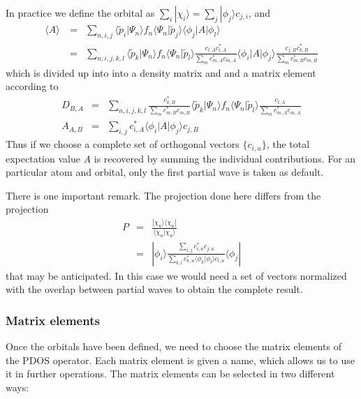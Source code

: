 \documentclass[final,12pt]{article}
\begin{document}
{{{{{{In practice we define the orbital as
$\sum_i|\chi_i\rangle=\sum_j|\phi_j\rangle c_{j,i}$, and
\begin{eqnarray*}
\langle A\rangle\
&=&\sum_{n,i,j}
\langle\tilde{p}_i|\Psi_n\rangle 
f_n\langle\Psi_n|\tilde{p}_j\rangle\langle\phi_j|A|\phi_l\rangle
\\
&=&\sum_{n,i,j,k,l}
\langle\tilde{p}_k|\Psi_n\rangle 
f_n\langle\Psi_n|\tilde{p}_l\rangle
\frac{c_{l,A}c^*_{i,A}}{\sum_m c^*_{m,A}c_{m,A}}
\langle\phi_i|A|\phi_j\rangle
\frac{c_{j,B}c^*_{k,B}}{\sum_m c^*_{m,B}c_{m,B}}
\end{eqnarray*}
which is divided up into into a density matrix and and a matrix
element according to
\begin{eqnarray*}
D_{B,A}&=&\sum_{n,i,j,k,l}
\frac{c^*_{k,B}}{\sum_m c^*_{m,B}c_{m,B}}
\langle\tilde{p}_k|\Psi_n\rangle 
f_n\langle\Psi_n|\tilde{p}_l\rangle
\frac{c_{l,A}}{\sum_m c^*_{m,A}c_{m,A}}
\\
A_{A,B}&=&\sum_{i,j}c^*_{i,A}\langle\phi_i|A|\phi_j\rangle c_{j,B}
\end{eqnarray*}
Thus if we choose a complete set of orthogonal vectors $\{c_{i,u}\}$,
the total expectation value $A$ is recovered by summing the individual
contributions. For an particular atom and orbital, only the first
partial wave is taken as default.

There is one important remark. The projection done here differs from
the projection 
\begin{eqnarray*}
P&=&\frac{|\chi_u\rangle\langle\chi_u|}{\langle\chi_u|\chi_u\rangle}
\\
&=&|\phi_i\rangle 
\frac{\sum_{i,j} c^*_{i,u}c_{j,u}}
{\sum_{k,l}c^*_{k,u}\langle\phi_k|\phi_l\rangle c_{l,u}}\langle\phi_j|
\end{eqnarray*}
that may be anticipated. In this case we would need a set of vectors
normalized with the overlap between partial waves to obtain the
complete result.


\subsubsection{Matrix elements}

Once the orbitals have been defined, we need to choose the matrix
elements of the PDOS operator. Each matrix element is given a name,
which allows us to use it in further operations. The matrix elements
can be selected in two different ways:

}}}}}}
\end{document}
